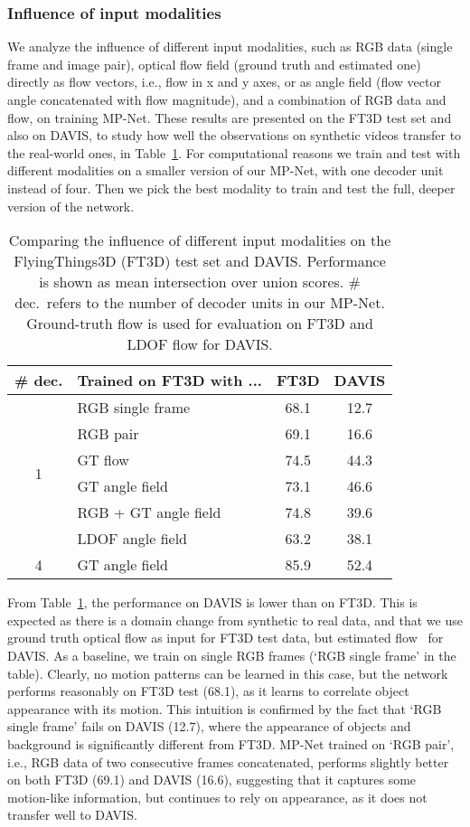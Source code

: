 \subsubsection{Influence of input modalities}
\label{sec:mod}
We analyze the influence of different input modalities, such as RGB data
(single frame and image pair), optical flow field (ground truth and estimated
one) directly as flow vectors, i.e., flow in x and y axes, or as angle field
(flow vector angle concatenated with flow magnitude), and a combination of RGB
data and flow, on training MP-Net. These results are presented on the FT3D test
set and also on DAVIS, to study how well the observations on synthetic videos
transfer to the real-world ones, in Table~\ref{tbl:input}. For computational
reasons we train and test with different modalities on a smaller version of our
MP-Net, with one decoder unit instead of four. Then we pick the best modality
to train and test the full, deeper version of the network.
\begin{table}
\begin{center}
\begin{tabular}{c|l|c|c}
\hline
\# dec. & Trained on FT3D with ... & FT3D & DAVIS \\
\hline
\multirow{6}{*}{1} & RGB single frame  & 68.1 & 12.7  \\
 & RGB pair  & 69.1 & 16.6  \\
 & GT flow  & 74.5 & 44.3  \\
 & GT angle field  & 73.1 & 46.6  \\
 & RGB + GT angle field  & 74.8 & 39.6  \\
 & LDOF angle field  & 63.2 & 38.1  \\
\hline
4 & GT angle field  & 85.9 & 52.4  \\
\hline
\end{tabular}
\caption{Comparing the influence of different input modalities on the
FlyingThings3D (FT3D) test set and DAVIS. Performance is shown as mean
intersection over union scores. \# dec.\ refers to the number of decoder units
in our MP-Net. Ground-truth flow is used for evaluation on FT3D and LDOF flow
for DAVIS.}
\label{tbl:input}
\end{center}
\end{table}

From Table~\ref{tbl:input}, the performance on DAVIS is lower than on FT3D.
This is expected as there is a domain change from synthetic to real data, and
that we use ground truth optical flow as input for FT3D test data, but
estimated flow~\cite{Brox11a,sundaram2010dense} for DAVIS. As a baseline, we
train on single RGB frames (`RGB single frame' in the table). Clearly, no
motion patterns can be learned in this case, but the network performs
reasonably on FT3D test (68.1), as it learns to correlate object appearance
with its motion. This intuition is confirmed by the fact that `RGB single
frame' fails on DAVIS (12.7), where the appearance of objects and background is
significantly different from FT3D.  MP-Net trained on `RGB pair', i.e., RGB
data of two consecutive frames concatenated, performs slightly better on both
FT3D (69.1) and DAVIS (16.6), suggesting that it captures some motion-like
information, but continues to rely on appearance, as it does not transfer well
to DAVIS.

